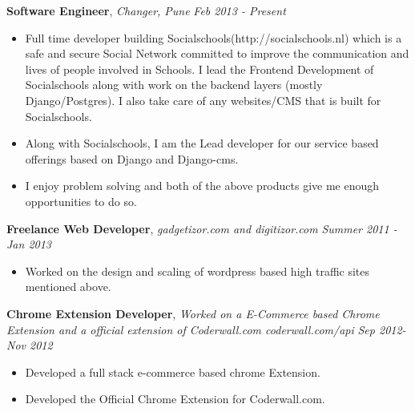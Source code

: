 \documentclass[9pt]{article}
\newenvironment{changemargin}[2]{%
  \begin{list}{}{%
    \setlength{\topsep}{0pt}%
    \setlength{\leftmargin}{#1}%
    \setlength{\rightmargin}{#2}%
    \setlength{\listparindent}{\parindent}%
    \setlength{\itemindent}{\parindent}%
    \setlength{\parsep}{\parskip}%
  }%
  \item[]}{\end{list}
}
\newenvironment{body} {
	\vspace*{-16pt}
	\begin{changemargin}{-0.25in}{-0.5in}
  }	
	{\end{changemargin}
}
\begin{document}
\begin{body}
	\vspace{14pt}
	\textbf{Software Engineer}, \emph{Changer, Pune} \hfill \emph{Feb 2013 - Present}\\
	\vspace*{-4pt}

\begin{itemize} 
	
	\item Full time developer building Socialschools(http://socialschools.nl) which is a safe and secure Social Network committed to improve the communication and lives of people involved in Schools. I lead the Frontend Development of Socialschools along with work on the backend layers (mostly Django/Postgres). I also take care of any websites/CMS that is built for Socialschools. 
\item Along with Socialschools, I am the Lead developer for our service based offerings based on Django and Django-cms. 

\item I enjoy problem solving and both of the above products give me enough opportunities to do so.
\end{itemize}
	\vspace{14pt}
	\textbf{Freelance Web Developer}, \emph{gadgetizor.com and digitizor.com} \hfill \emph{Summer 2011 - Jan 2013}\\
	\vspace*{-4pt}
	\begin{itemize} \itemsep -0pt  %
		\item Worked on the design and scaling of wordpress based high traffic sites mentioned above.
	\end{itemize}

	\textbf {Chrome Extension Developer}, \emph{Worked on a E-Commerce based Chrome Extension and a official extension of Coderwall.com coderwall.com/api} \hfill \emph{Sep 2012-Nov 2012}\\
	\vspace*{-4pt}
	\begin{itemize} \itemsep -0pt
		\item Developed a full stack e-commerce based chrome Extension.
		\item Developed the Official Chrome Extension for Coderwall.com.
	\end{itemize}
\end{body}

\smallskip
\end{document}
